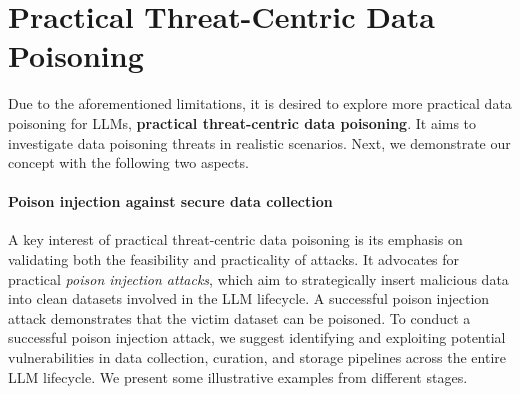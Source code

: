 \section{Practical Threat-Centric Data Poisoning} \label{section:threat}

Due to the aforementioned limitations, it is desired to explore more practical data poisoning for LLMs, \textbf{practical threat-centric data poisoning}. It aims to investigate data poisoning threats in realistic scenarios. Next, we demonstrate our concept with the following two aspects.

\paragraph{Poison injection against secure data collection}
A key interest of practical threat-centric data poisoning is its emphasis on validating both the feasibility and practicality of attacks. 
It advocates for practical \textit{poison injection attacks}, which aim to strategically insert malicious data into clean datasets involved in the LLM lifecycle. 
A successful poison injection attack demonstrates that the victim dataset can be poisoned.
To conduct a successful poison injection attack, 
we suggest identifying and exploiting potential vulnerabilities in data collection, curation, and storage pipelines across the entire LLM lifecycle. We present some illustrative examples from different stages. 
\vspace{-10pt}

